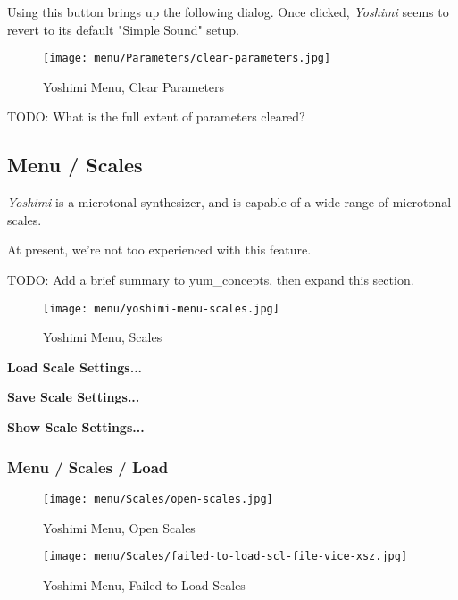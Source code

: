   Using this button brings up the following dialog.  Once clicked,
   \textsl{Yoshimi} seems to revert to its default "Simple Sound" setup.

\begin{figure}[H]
   \centering 
   \texttt{[image: menu/Parameters/clear-parameters.jpg]}
   \caption{Yoshimi Menu, Clear Parameters}
   \label{fig:yoshimi_menu_clear_parameters}
\end{figure}

   TODO:  What is the full extent of parameters cleared?

\subsection{Menu / Scales}
\label{subsec:menu_scales}

   \textsl{Yoshimi} is a microtonal synthesizer, and is capable of a wide
   range of microtonal scales.

   At present, we're not too experienced with this feature.
   
   TODO:  Add a brief summary to yum\_concepts, then expand this section.

\begin{figure}[H]
   \centering 
   \texttt{[image: menu/yoshimi-menu-scales.jpg]}
   \caption{Yoshimi Menu, Scales}
   \label{fig:yoshimi_menu_scales}
\end{figure}

   \begin{enumber}
      \item \textbf{Load Scale Settings...}
      \item \textbf{Save Scale Settings...}
      \item \textbf{Show Scale Settings...}
   \end{enumber}

\subsubsection{Menu / Scales / Load}
\label{subsec:menu_scales_load}

\begin{figure}[H]
   \centering 
   \texttt{[image: menu/Scales/open-scales.jpg]}
   \caption{Yoshimi Menu, Open Scales}
   \label{fig:yoshimi_menu_open_scales}
\end{figure}

\begin{figure}[H]
   \centering 
   \texttt{[image: menu/Scales/failed-to-load-scl-file-vice-xsz.jpg]}
   \caption{Yoshimi Menu, Failed to Load Scales}
   \label{fig:yoshimi_menu_failed_to_load_scales}
\end{figure}

